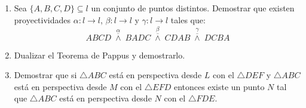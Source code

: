 \documentclass[12pt]{report}
\numberwithin{section}{chapter}
\begin{document}
\begin{enumerate}
\item Sea $\{A,B,C,D\}\subseteq l$ un conjunto de puntos distintos. Demostrar que existen proyectividades $\alpha: l \to l$, $\beta: l \to l$ y $\gamma:l \to l$ tales que:
$$ABCD\; \overset{\alpha}{\overline{\wedge}}\; BADC\; \overset{\beta}{\overline{\wedge}}\; CDAB \; \overset{\gamma}{\overline{\wedge}}\;DCBA$$



\item Dualizar el Teorema de Pappus y demostrarlo.

\item Demostrar que si $\triangle ABC$ está en perspectiva desde $L$ con el $\triangle DEF$ y $\triangle ABC$ está en perspectiva desde $M$ con el $\triangle EFD$ entonces existe un punto $N$ tal que $\triangle ABC$ está en perspectiva desde $N$ con el $\triangle FDE$.


\end{enumerate}
\end{document}
